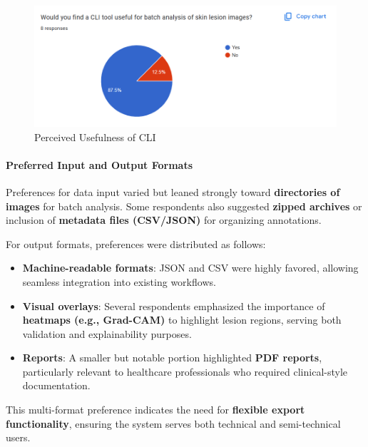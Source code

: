 \documentclass[
  12pt,
  oneside]{article}
\providecommand{\tightlist}{%
  \setlength{\itemsep}{0pt}\setlength{\parskip}{0pt}}
\begin{document}
\begin{figure}

{\centering \includegraphics[width=1\linewidth]{technical-user-chart4} 

}

\caption{Perceived Usefulness of CLI}\label{fig:unnamed-chunk-11}
\end{figure}

\paragraph{Preferred Input and Output
Formats}\label{preferred-input-and-output-formats}

Preferences for data input varied but leaned strongly toward
\textbf{directories of images} for batch analysis. Some respondents also
suggested \textbf{zipped archives} or inclusion of \textbf{metadata
files (CSV/JSON)} for organizing annotations.

For output formats, preferences were distributed as follows:

\begin{itemize}
\tightlist
\item
  \textbf{Machine-readable formats}: JSON and CSV were highly favored,
  allowing seamless integration into existing workflows.
\item
  \textbf{Visual overlays}: Several respondents emphasized the
  importance of \textbf{heatmaps (e.g., Grad-CAM)} to highlight lesion
  regions, serving both validation and explainability purposes.
\item
  \textbf{Reports}: A smaller but notable portion highlighted
  \textbf{PDF reports}, particularly relevant to healthcare
  professionals who required clinical-style documentation.
\end{itemize}

This multi-format preference indicates the need for \textbf{flexible
export functionality}, ensuring the system serves both technical and
semi-technical users.
\end{document}
